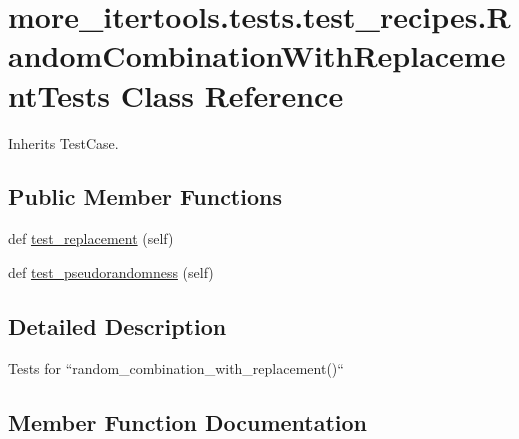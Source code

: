 \hypertarget{classmore__itertools_1_1tests_1_1test__recipes_1_1_random_combination_with_replacement_tests}{}\section{more\+\_\+itertools.\+tests.\+test\+\_\+recipes.\+Random\+Combination\+With\+Replacement\+Tests Class Reference}
\label{classmore__itertools_1_1tests_1_1test__recipes_1_1_random_combination_with_replacement_tests}


Inherits Test\+Case.

\subsection*{Public Member Functions}
\begin{DoxyCompactItemize}
\item 
def \hyperlink{classmore__itertools_1_1tests_1_1test__recipes_1_1_random_combination_with_replacement_tests_a6ec1cfa188b2e8773d56a41bcfe12b02}{test\+\_\+replacement} (self)
\item 
def \hyperlink{classmore__itertools_1_1tests_1_1test__recipes_1_1_random_combination_with_replacement_tests_a83c1c8d385e3f9579bbc597931068328}{test\+\_\+pseudorandomness} (self)
\end{DoxyCompactItemize}


\subsection{Detailed Description}
\begin{DoxyVerb}Tests for ``random_combination_with_replacement()``\end{DoxyVerb}
 

\subsection{Member Function Documentation}
\mbox{\label{classmore__itertools_1_1tests_1_1test__recipes_1_1_random_combination_with_replacement_tests_a83c1c8d385e3f9579bbc597931068328}} 
